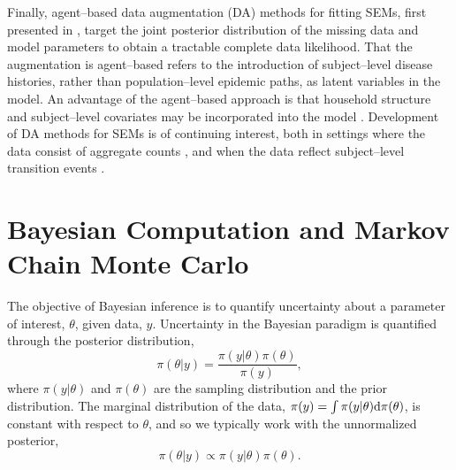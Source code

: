 Finally, agent--based data augmentation (DA) methods for fitting SEMs, first presented in \cite{gibson1998,oneill1999}, target the joint posterior distribution of the missing data and model parameters to obtain a tractable complete data likelihood. That the augmentation is agent--based refers to the introduction of subject--level disease histories, rather than population--level epidemic paths, as latent variables in the model. An advantage of the agent--based approach is that household structure and subject--level covariates may be incorporated into the model \cite{auranen2000,hohle2002,cauchemez2004bayesian, neal2004statistical,oneill2009}. Development of DA methods for SEMs is of continuing interest, both in settings where the data consist of aggregate counts \cite{pooley2015,QinShe15,shestopaloff2016sampling}, and when the data reflect subject--level transition events \cite{kypraios2018bayesian,xu2016bayesian}.

\section{Bayesian Computation and Markov Chain Monte Carlo}
\label{sec:bayesian_computation}

The objective of Bayesian inference is to quantify uncertainty about a parameter of interest, $ \theta $, given data, $ y $. Uncertainty in the Bayesian paradigm is quantified through the posterior distribution, $$\pi(\theta|y)=\frac{\pi(y|\theta)\pi(\theta)}{\pi(y)},$$
where $ \pi(y|\theta) $ and $ \pi(\theta) $ are the sampling distribution and the prior distribution. The marginal distribution of the data, $ \pi(y) = \int\pi(y|\theta)\mathrm{d}\pi(\theta) $, is constant with respect to $ \theta $, and so we typically work with the unnormalized posterior, $$ \pi(\theta|y)\propto\pi(y|\theta)\pi(\theta). $$


